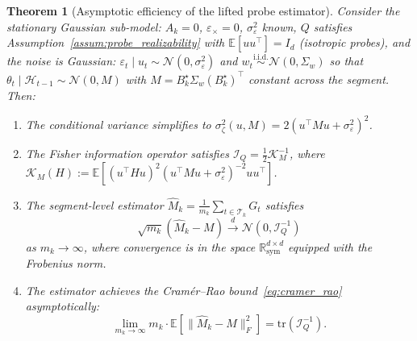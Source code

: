 \documentclass[12pt]{article}
\newcommand{\E}{\mathbb{E}}
\newcommand{\cH}{\mathcal{H}}
\newcommand{\cT}{\mathcal{T}}
\newcommand{\Rsy}{\mathbb{R}^{d\times d}_{\mathrm{sym}}}
\newcommand{\tr}{\mathrm{tr}}
\newtheorem{theorem}{Theorem}
\theoremstyle{plain}
\theoremstyle{definition}
\begin{document}
\begin{theorem}[Asymptotic efficiency of the lifted probe estimator]
\label{thm:efficiency}
Consider the stationary Gaussian sub-model: $A_k = 0$, $\varepsilon_\times = 0$, $\sigma_\varepsilon^2$ known, $Q$ satisfies Assumption~\ref{assum:probe_realizability} with $\E[uu^\top] = I_d$ (isotropic probes), and the noise is Gaussian: $\varepsilon_t \mid u_t \sim \mathcal{N}(0, \sigma_\varepsilon^2)$ and $w_t \stackrel{\mathrm{i.i.d.}}{\sim} \mathcal{N}(0, \Sigma_w)$ so that $\theta_t \mid \cH_{t-1} \sim \mathcal{N}(0, M)$ with $M = B_k^\star \Sigma_w (B_k^\star)^\top$ constant across the segment. Then:
\begin{enumerate}[label=(\roman*)]
\item The conditional variance simplifies to $\sigma_\zeta^2(u, M) = 2(u^\top M u + \sigma_\varepsilon^2)^2$.
\item The Fisher information operator satisfies $\mathcal{I}_Q = \frac{1}{2}\mathcal{K}_M^{-1}$, where $\mathcal{K}_M(H) := \E[(u^\top H u)^2 (u^\top M u + \sigma_\varepsilon^2)^{-2} uu^\top]$.
\item The segment-level estimator $\widehat{M}_k = \frac{1}{m_k}\sum_{t \in \cT_k} G_t$ satisfies
\begin{equation}
\sqrt{m_k}(\widehat{M}_k - M) \xrightarrow{d} \mathcal{N}(0, \mathcal{I}_Q^{-1})
\label{eq:asymptotic_normality}
\end{equation}
as $m_k \to \infty$, where convergence is in the space $\Rsy$ equipped with the Frobenius norm.
\item The estimator achieves the Cram\'er--Rao bound~\eqref{eq:cramer_rao} asymptotically:
\[
\lim_{m_k \to \infty} m_k \cdot \E\!\left[\|\widehat{M}_k - M\|_F^2\right] = \tr(\mathcal{I}_Q^{-1}).
\]
\end{enumerate}
\end{theorem}
\end{document}
